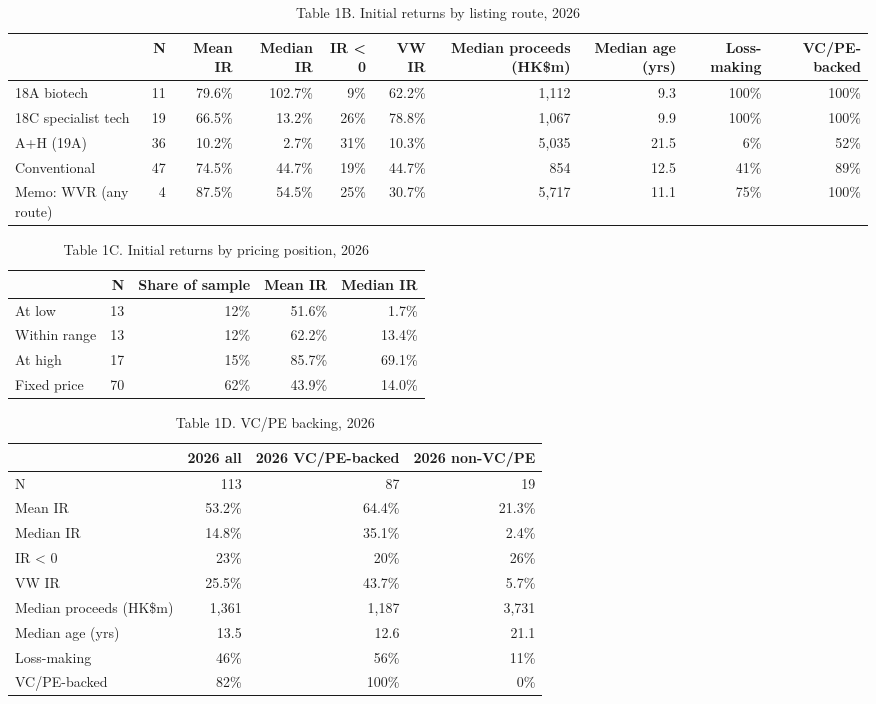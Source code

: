 \begin{table}[htbp]\centering\small
\caption{Table 1B. Initial returns by listing route, 2026}
\begin{tabular}{lrrrrrrrrr}
\hline
 & N & Mean IR & Median IR & IR < 0 & VW IR & Median proceeds (HK\$m) & Median age (yrs) & Loss-making & VC/PE-backed \\
\hline
18A biotech & 11 & 79.6\% & 102.7\% & 9\% & 62.2\% & 1,112 & 9.3 & 100\% & 100\% \\
18C specialist tech & 19 & 66.5\% & 13.2\% & 26\% & 78.8\% & 1,067 & 9.9 & 100\% & 100\% \\
A+H (19A) & 36 & 10.2\% & 2.7\% & 31\% & 10.3\% & 5,035 & 21.5 & 6\% & 52\% \\
Conventional & 47 & 74.5\% & 44.7\% & 19\% & 44.7\% & 854 & 12.5 & 41\% & 89\% \\
Memo: WVR (any route) & 4 & 87.5\% & 54.5\% & 25\% & 30.7\% & 5,717 & 11.1 & 75\% & 100\% \\
\hline
\end{tabular}
\end{table}

\begin{table}[htbp]\centering\small
\caption{Table 1C. Initial returns by pricing position, 2026}
\begin{tabular}{lrrrr}
\hline
 & N & Share of sample & Mean IR & Median IR \\
\hline
At low & 13 & 12\% & 51.6\% & 1.7\% \\
Within range & 13 & 12\% & 62.2\% & 13.4\% \\
At high & 17 & 15\% & 85.7\% & 69.1\% \\
Fixed price & 70 & 62\% & 43.9\% & 14.0\% \\
\hline
\end{tabular}
\end{table}

\begin{table}[htbp]\centering\small
\caption{Table 1D. VC/PE backing, 2026}
\begin{tabular}{lrrr}
\hline
 & 2026 all & 2026 VC/PE-backed & 2026 non-VC/PE \\
\hline
N & 113 & 87 & 19 \\
Mean IR & 53.2\% & 64.4\% & 21.3\% \\
Median IR & 14.8\% & 35.1\% & 2.4\% \\
IR < 0 & 23\% & 20\% & 26\% \\
VW IR & 25.5\% & 43.7\% & 5.7\% \\
Median proceeds (HK\$m) & 1,361 & 1,187 & 3,731 \\
Median age (yrs) & 13.5 & 12.6 & 21.1 \\
Loss-making & 46\% & 56\% & 11\% \\
VC/PE-backed & 82\% & 100\% & 0\% \\
\hline
\end{tabular}
\end{table}
